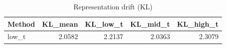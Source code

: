 \begin{table}[htbp]
\centering
\caption{Representation drift (KL)}
\label{tab:repr-drift}
\begin{tabular}{lrrrr}
\toprule
\textbf{Method} & \textbf{KL\_mean} & \textbf{KL\_low\_t} & \textbf{KL\_mid\_t} & \textbf{KL\_high\_t} \\
\midrule
low\_t & 2.0582 & 2.2137 & 2.0363 & 2.3079 \\
\bottomrule
\end{tabular}
\end{table}